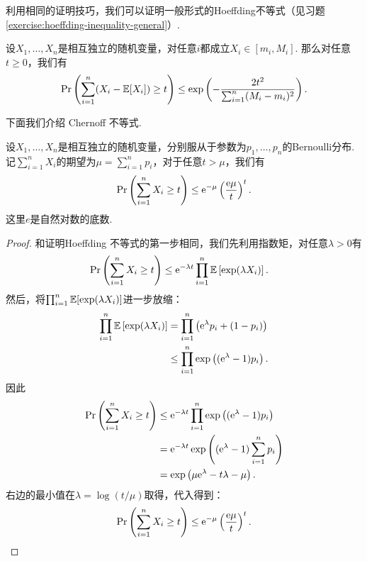 利用相同的证明技巧，我们可以证明一般形式的Hoeffding不等式（见习题 \ref{exercise:hoeffding-inequality-general}）.

\begin{theorem}\label{thm:hoeffding-inequality-general}
    设$X_1, \dots, X_n$是相互独立的随机变量，对任意$i$都成立$X_i \in [m_i, M_i]$. 那么对任意$t\geq0$，我们有
    \[
        \Pr\left(\sum_{i=1}^n (X_i - \mathbb{E} [X_i]) \geq t\right) \leq \exp \left( - \frac{2t^2}{\sum_{i=1}^n (M_i - m_i)^2}\right).
    \]
\end{theorem}

下面我们介绍 Chernoff 不等式. 
\begin{theorem}\label{thm:chernoff-inequality}
    设$X_1, \dots, X_n$是相互独立的随机变量，分别服从于参数为$p_1, \dots, p_n$的Bernoulli分布.  记$\sum_{i=1}^n X_i$的期望为$\mu = \sum_{i=1}^n p_i$，对于任意$t > \mu$，我们有
    \[
        \Pr\left( \sum_{i=1}^n X_i \geq t\right) \leq \mathrm{e}^{-\mu} \left(\frac{\mathrm{e}\mu}{t}\right)^t.  
    \]
    这里$e$是自然对数的底数.
\end{theorem}

\begin{proof}
和证明Hoeffding 不等式的第一步相同，我们先利用指数矩，对任意$\lambda > 0$有
    \[
    \begin{aligned}
        \Pr\left( \sum_{i=1}^n X_i \geq t\right) &\leq \mathrm{e}^{-\lambda t}\prod_{i=1}^n \mathbb{E}\left[\exp (\lambda X_i)\right].
    \end{aligned}
    \]
然后，将$\prod_{i=1}^n\mathbb{E}[\exp (\lambda X_i)]$进一步放缩：
    \[
    \begin{aligned}
        \prod_{i=1}^n \mathbb{E} \left[\exp (\lambda X_i)\right]&= \prod_{i=1}^n \left(\mathrm{e}^\lambda p_i + (1 - p_i) \right) \\
         &\leq \prod_{i=1}^n \exp\left((\mathrm{e}^\lambda -1)p_i \right). \\
    \end{aligned}
    \]
因此
    \[
    \begin{aligned}
        \Pr\left( \sum_{i=1}^n X_i \geq t\right) &\leq \mathrm{e}^{-\lambda t}\prod_{i=1}^n \exp\left((\mathrm{e}^\lambda -1)p_i \right) \\
        &= \mathrm{e}^{-\lambda t} \exp\left((\mathrm{e}^\lambda -1)\sum_{i=1}^n p_i \right)\\
        &=\exp\left(\mu \mathrm{e}^\lambda -t\lambda-\mu \right).
    \end{aligned}
    \]
右边的最小值在$\lambda = \log (t/\mu)$取得，代入得到：
    \[
    \begin{aligned}
        \Pr\left( \sum_{i=1}^n X_i \geq t\right) \leq \mathrm{e}^{-\mu} \left(\frac{\mathrm{e}\mu}{t}\right)^t.
    \end{aligned}
    \]
\end{proof}

